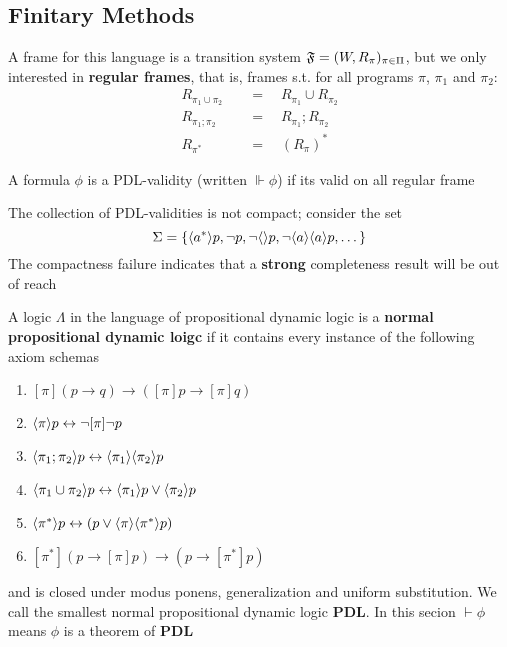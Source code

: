 \documentclass[11pt]{article}
\newcommand{\PDL}{\textbf{PDL}}
\begin{document}
\subsection{Finitary Methods }
\label{sec:org8315a0d}

A frame for this language is a transition system
\(\mathfrak{F}=(W,R_{\pi})_{\pi\in\Pi}\), but we only interested in \textbf{regular frames}, that
is, frames s.t. for all programs \(\pi\), \(\pi_1\) and \(\pi_2\):
\begin{align*}
R_{\pi_1\cup\pi_2}&\quad=\quad R_{\pi_1}\cup R_{\pi_2}\\
R_{\pi_1;\pi_2}&\quad=\quad R_{\pi_1};R_{\pi_2}\\
R_{\pi^*}&\quad=\quad (R_{\pi})^*
\end{align*}

A formula \(\phi\) is a PDL-validity (written \(\Vdash\phi\)) if its valid on all
regular frame

The collection of PDL-validities is not compact; consider the set
\begin{equation*}
\Sigma=\{\langle a^*\rangle p,\neg p,\neg\langle\rangle p,\neg\langle a\rangle\langle a\rangle p,\dots\}
\end{equation*}
The compactness failure indicates that a \textbf{strong} completeness result will be
out of reach


\begin{definition}[]
A logic \(\Lambda\) in the language of propositional dynamic logic is a
\textbf{normal propositional dynamic loigc} if it contains every instance of the
following axiom schemas
\begin{enumerate}
\item \([\pi](p\to q)\to([\pi]p\to[\pi]q)\)
\item \(\langle\pi\rangle p\leftrightarrow\neg[\pi]\neg p\)
\item \(\langle\pi_1;\pi_2\rangle p\leftrightarrow\langle\pi_1\rangle\langle\pi_2\rangle p\)
\item \(\langle\pi_1\cup\pi_2\rangle p\leftrightarrow\langle\pi_1\rangle p\vee\langle\pi_2\rangle p\)
\item \(\langle\pi^*\rangle p\leftrightarrow(p\vee\langle\pi\rangle\langle\pi^*\rangle p)\)
\item \([\pi^*](p\to[\pi]p)\to(p\to[\pi^*]p)\)
\end{enumerate}


and is closed under modus ponens, generalization and uniform substitution. We
call the smallest normal propositional dynamic logic \(\PDL\). In this secion
\(\vdash\phi\) means \(\phi\) is a theorem of \(\PDL\)
\end{definition}
\end{document}

